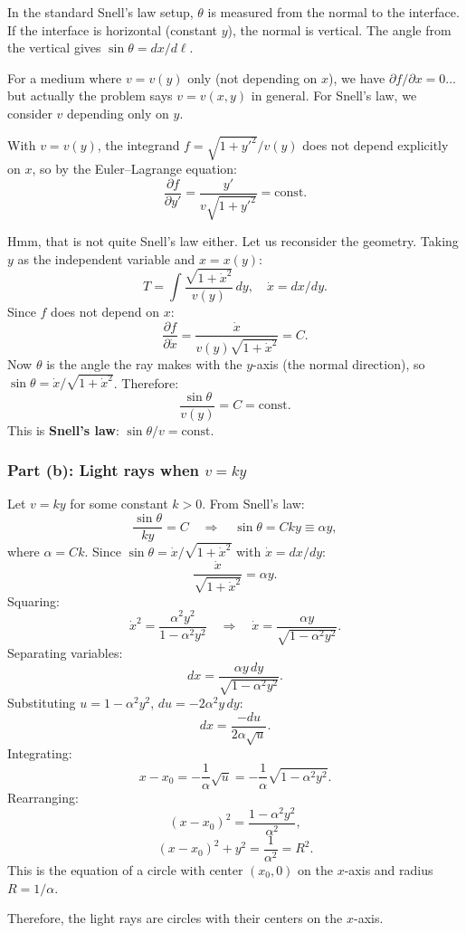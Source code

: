 \documentclass[12pt]{article}
\begin{document}
In the standard Snell's law setup, $\theta$ is measured from the normal to the interface. If the interface is horizontal (constant $y$), the normal is vertical. The angle from the vertical gives $\sin\theta = dx/d\ell$.

For a medium where $v = v(y)$ only (not depending on $x$), we have $\partial f/\partial x = 0$... but actually the problem says $v = v(x,y)$ in general. For Snell's law, we consider $v$ depending only on $y$.

With $v = v(y)$, the integrand $f = \sqrt{1+y'^2}/v(y)$ does not depend explicitly on $x$, so by the Euler--Lagrange equation:
\[
  \frac{\partial f}{\partial y'} = \frac{y'}{v\sqrt{1+y'^2}} = \text{const}.
\]

Hmm, that is not quite Snell's law either. Let us reconsider the geometry. Taking $y$ as the independent variable and $x = x(y)$:
\[
  T = \int \frac{\sqrt{1+\dot{x}^2}}{v(y)}\,dy, \quad \dot{x} = dx/dy.
\]
Since $f$ does not depend on $x$:
\[
  \frac{\partial f}{\partial \dot{x}} = \frac{\dot{x}}{v(y)\sqrt{1+\dot{x}^2}} = C.
\]
Now $\theta$ is the angle the ray makes with the $y$-axis (the normal direction), so $\sin\theta = \dot{x}/\sqrt{1+\dot{x}^2}$. Therefore:
\[
  \frac{\sin\theta}{v(y)} = C = \text{const}.
\]
This is \textbf{Snell's law}: $\sin\theta / v = \text{const}$.

\subsubsection*{Part (b): Light rays when $v = ky$}

Let $v = ky$ for some constant $k > 0$. From Snell's law:
\[
  \frac{\sin\theta}{ky} = C
  \quad \Longrightarrow \quad
  \sin\theta = Cky \equiv \alpha y,
\]
where $\alpha = Ck$. Since $\sin\theta = \dot{x}/\sqrt{1+\dot{x}^2}$ with $\dot{x} = dx/dy$:
\[
  \frac{\dot{x}}{\sqrt{1+\dot{x}^2}} = \alpha y.
\]
Squaring:
\[
  \dot{x}^2 = \frac{\alpha^2 y^2}{1 - \alpha^2 y^2}
  \quad \Longrightarrow \quad
  \dot{x} = \frac{\alpha y}{\sqrt{1-\alpha^2 y^2}}.
\]
Separating variables:
\[
  dx = \frac{\alpha y\,dy}{\sqrt{1-\alpha^2 y^2}}.
\]
Substituting $u = 1 - \alpha^2 y^2$, $du = -2\alpha^2 y\,dy$:
\[
  dx = \frac{-du}{2\alpha\sqrt{u}}.
\]
Integrating:
\[
  x - x_0 = -\frac{1}{\alpha}\sqrt{u} = -\frac{1}{\alpha}\sqrt{1-\alpha^2 y^2}.
\]
Rearranging:
\[
  (x - x_0)^2 = \frac{1-\alpha^2 y^2}{\alpha^2},
\]
\[
  (x-x_0)^2 + y^2 = \frac{1}{\alpha^2} = R^2.
\]
This is the equation of a circle with center $(x_0, 0)$ on the $x$-axis and radius $R = 1/\alpha$.

Therefore, the light rays are circles with their centers on the $x$-axis.
\end{document}
